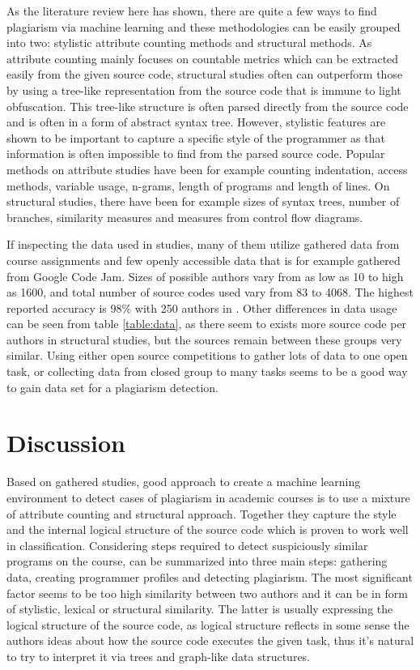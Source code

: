\documentclass[english]{tktltiki2}
\theoremstyle{definition}
\theoremstyle{remark}
\begin{document}
As the literature review here has shown, there are quite a few ways to find plagiarism via machine learning and these methodologies can be easily grouped into two: stylistic attribute counting methods and structural methods. As attribute counting mainly focuses on countable metrics which can be extracted easily from the given source code, structural studies often can outperform those by using a tree-like representation from the source code that is immune to light obfuscation. This tree-like structure is often parsed directly from the source code and is often in a form of abstract syntax tree. However, stylistic features are shown to be important to capture a specific style of the programmer as that information is often impossible to find from the parsed source code. Popular methods on attribute studies have been for example counting indentation, access methods, variable usage, n-grams, length of programs and length of lines. On structural studies, there have been for example sizes of syntax trees, number of branches, similarity measures and measures from control flow diagrams. 

If inspecting the data used in studies, many of them utilize gathered data from course assignments and few openly accessible data that is for example gathered from Google Code Jam. Sizes of possible authors vary from as low as 10 to high as 1600, and total number of source codes used vary from 83 to 4068. The highest reported accuracy is 98\% with 250 authors in \cite{caliskan2015anonymizing}. Other differences in data usage can be seen from table \ref{table:data}, as there seem to exists more source code per authors in structural studies, but the sources remain between these groups very similar. Using either open source competitions to gather lots of data to one open task, or collecting data from closed group to many tasks seems to be a good way to gain data set for a plagiarism detection.




\section{Discussion}

Based on gathered studies, good approach to create a machine learning environment to detect cases of plagiarism in academic courses is to use a mixture of attribute counting and structural approach. Together they capture the style and the internal logical structure of the source code which is proven to work well in classification. Considering steps required to detect suspiciously similar programs on the course, can be summarized into three main steps: gathering data, creating programmer profiles and detecting plagiarism. The most significant factor seems to be too high similarity between two authors and it can be in form of stylistic, lexical or structural similarity. The latter is usually expressing the logical structure of the source code, as logical structure reflects in some sense the authors ideas about how the source code executes the given task, thus it's natural to try to interpret it via trees and graph-like data structures. 
\end{document}
